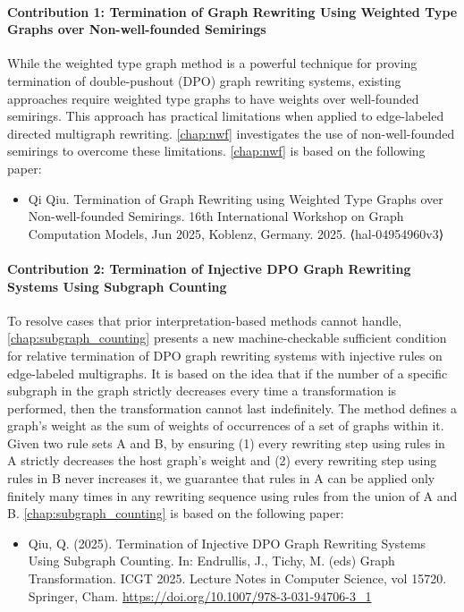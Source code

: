 \paragraph{Contribution 1: Termination of Graph Rewriting Using Weighted Type Graphs over Non-well-founded Semirings}
While the weighted type graph method is a powerful technique for proving termination of double-pushout (DPO) graph rewriting systems, existing approaches require weighted type graphs to have weights over well-founded semirings. This approach has practical limitations when applied to edge-labeled directed multigraph rewriting. \autoref{chap:nwf} investigates the use of non-well-founded semirings to overcome these limitations. \autoref{chap:nwf} is based on the following paper:
\begin{itemize}
    \item Qi Qiu. Termination of Graph Rewriting using Weighted Type Graphs over Non-well-founded Semirings. 16th International Workshop on Graph Computation Models, Jun 2025, Koblenz, Germany. 2025. ⟨hal-04954960v3⟩
\end{itemize}
 
\paragraph{Contribution 2: Termination of Injective DPO Graph Rewriting Systems Using Subgraph Counting} 
To resolve cases that prior interpretation-based methods cannot handle, \autoref{chap:subgraph_counting} presents a new machine-checkable sufficient condition for relative termination of DPO graph rewriting systems with injective rules on edge-labeled multigraphs. 
It is based on the idea that if the number of a specific subgraph in the graph strictly decreases every time a transformation is performed, then the transformation cannot last indefinitely.
The method defines a graph's weight as the sum of weights of occurrences of a set of graphs within it. Given two rule sets A and B, by ensuring 
(1) every rewriting step using rules in A strictly decreases the host graph's weight and 
(2) every rewriting step using rules in B never increases it, we guarantee that rules in A can be applied only finitely many times in any rewriting sequence using rules from the union of A and B. 
\autoref{chap:subgraph_counting} is based on the following paper:
\begin{itemize}
    \item Qiu, Q. (2025). Termination of Injective DPO Graph Rewriting Systems Using Subgraph Counting. In: Endrullis, J., Tichy, M. (eds) Graph Transformation. ICGT 2025. Lecture Notes in Computer Science, vol 15720. Springer, Cham. \url{https://doi.org/10.1007/978-3-031-94706-3_1}
\end{itemize}

